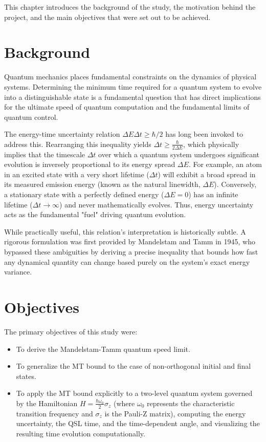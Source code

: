 This chapter introduces the background of the study, the motivation behind the project, and the main objectives that were set out to be achieved.
\section{Background}
Quantum mechanics places fundamental constraints on the dynamics of physical systems. Determining the minimum time required for a quantum system to evolve into a distinguishable state is a fundamental question that has direct implications for the ultimate speed of quantum computation and the fundamental limits of quantum control.

The energy-time uncertainty relation $\Delta E \Delta t \ge \hbar / 2$ has long been invoked to address this. Rearranging this inequality yields $\Delta t \ge \frac{\hbar}{2 \Delta E}$, which physically implies that the timescale $\Delta t$ over which a quantum system undergoes significant evolution is inversely proportional to its energy spread $\Delta E$. For example, an atom in an excited state with a very short lifetime ($\Delta t$) will exhibit a broad spread in its measured emission energy (known as the natural linewidth, $\Delta E$). Conversely, a stationary state with a perfectly defined energy ($\Delta E = 0$) has an infinite lifetime ($\Delta t \to \infty$) and never mathematically evolves. Thus, energy uncertainty acts as the fundamental "fuel" driving quantum evolution. 

While practically useful, this relation's interpretation is historically subtle. A rigorous formulation was first provided by Mandelstam and Tamm in 1945, who bypassed these ambiguities by deriving a precise inequality that bounds how fast any dynamical quantity can change based purely on the system's exact energy variance.

\section{Objectives}
The primary objectives of this study were:
\begin{itemize}
    \item To derive the Mandelstam-Tamm quantum speed limit.
    \item To generalize the MT bound to the case of non-orthogonal initial and final states.
    \item To apply the MT bound explicitly to a two-level quantum system governed by the Hamiltonian $H = \frac{\hbar \omega_0}{2} \sigma_z$ (where $\omega_0$ represents the characteristic transition frequency and $\sigma_z$ is the Pauli-Z matrix), computing the energy uncertainty, the QSL time, and the time-dependent angle, and visualizing the resulting time evolution computationally.
\end{itemize}
